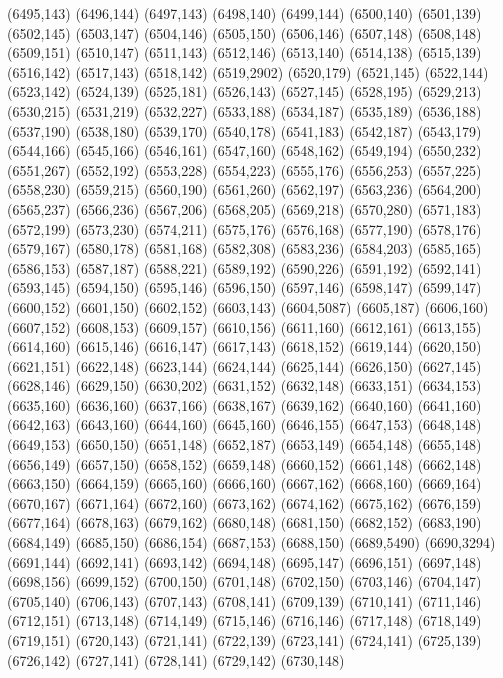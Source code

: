 (6495,143)
(6496,144)
(6497,143)
(6498,140)
(6499,144)
(6500,140)
(6501,139)
(6502,145)
(6503,147)
(6504,146)
(6505,150)
(6506,146)
(6507,148)
(6508,148)
(6509,151)
(6510,147)
(6511,143)
(6512,146)
(6513,140)
(6514,138)
(6515,139)
(6516,142)
(6517,143)
(6518,142)
(6519,2902)
(6520,179)
(6521,145)
(6522,144)
(6523,142)
(6524,139)
(6525,181)
(6526,143)
(6527,145)
(6528,195)
(6529,213)
(6530,215)
(6531,219)
(6532,227)
(6533,188)
(6534,187)
(6535,189)
(6536,188)
(6537,190)
(6538,180)
(6539,170)
(6540,178)
(6541,183)
(6542,187)
(6543,179)
(6544,166)
(6545,166)
(6546,161)
(6547,160)
(6548,162)
(6549,194)
(6550,232)
(6551,267)
(6552,192)
(6553,228)
(6554,223)
(6555,176)
(6556,253)
(6557,225)
(6558,230)
(6559,215)
(6560,190)
(6561,260)
(6562,197)
(6563,236)
(6564,200)
(6565,237)
(6566,236)
(6567,206)
(6568,205)
(6569,218)
(6570,280)
(6571,183)
(6572,199)
(6573,230)
(6574,211)
(6575,176)
(6576,168)
(6577,190)
(6578,176)
(6579,167)
(6580,178)
(6581,168)
(6582,308)
(6583,236)
(6584,203)
(6585,165)
(6586,153)
(6587,187)
(6588,221)
(6589,192)
(6590,226)
(6591,192)
(6592,141)
(6593,145)
(6594,150)
(6595,146)
(6596,150)
(6597,146)
(6598,147)
(6599,147)
(6600,152)
(6601,150)
(6602,152)
(6603,143)
(6604,5087)
(6605,187)
(6606,160)
(6607,152)
(6608,153)
(6609,157)
(6610,156)
(6611,160)
(6612,161)
(6613,155)
(6614,160)
(6615,146)
(6616,147)
(6617,143)
(6618,152)
(6619,144)
(6620,150)
(6621,151)
(6622,148)
(6623,144)
(6624,144)
(6625,144)
(6626,150)
(6627,145)
(6628,146)
(6629,150)
(6630,202)
(6631,152)
(6632,148)
(6633,151)
(6634,153)
(6635,160)
(6636,160)
(6637,166)
(6638,167)
(6639,162)
(6640,160)
(6641,160)
(6642,163)
(6643,160)
(6644,160)
(6645,160)
(6646,155)
(6647,153)
(6648,148)
(6649,153)
(6650,150)
(6651,148)
(6652,187)
(6653,149)
(6654,148)
(6655,148)
(6656,149)
(6657,150)
(6658,152)
(6659,148)
(6660,152)
(6661,148)
(6662,148)
(6663,150)
(6664,159)
(6665,160)
(6666,160)
(6667,162)
(6668,160)
(6669,164)
(6670,167)
(6671,164)
(6672,160)
(6673,162)
(6674,162)
(6675,162)
(6676,159)
(6677,164)
(6678,163)
(6679,162)
(6680,148)
(6681,150)
(6682,152)
(6683,190)
(6684,149)
(6685,150)
(6686,154)
(6687,153)
(6688,150)
(6689,5490)
(6690,3294)
(6691,144)
(6692,141)
(6693,142)
(6694,148)
(6695,147)
(6696,151)
(6697,148)
(6698,156)
(6699,152)
(6700,150)
(6701,148)
(6702,150)
(6703,146)
(6704,147)
(6705,140)
(6706,143)
(6707,143)
(6708,141)
(6709,139)
(6710,141)
(6711,146)
(6712,151)
(6713,148)
(6714,149)
(6715,146)
(6716,146)
(6717,148)
(6718,149)
(6719,151)
(6720,143)
(6721,141)
(6722,139)
(6723,141)
(6724,141)
(6725,139)
(6726,142)
(6727,141)
(6728,141)
(6729,142)
(6730,148)
